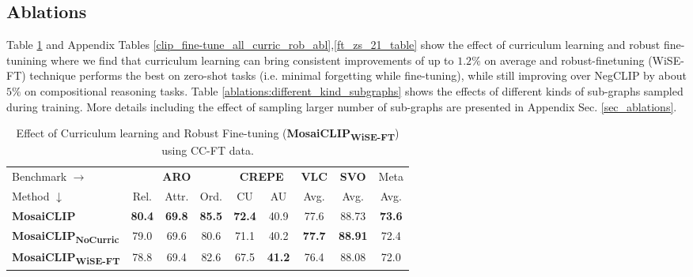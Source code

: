\documentclass[11pt]{article}
\newcommand{\methodcompbold}{\textbf{MosaiCLIP}}
\newcommand{\methodcompNoCurricbold}{\textbf{MosaiCLIP\textsubscript{NoCurric}}}
\newcommand{\methodcompwiseftbold}{\textbf{MosaiCLIP\textsubscript{WiSE-FT}}}
\newcommand{\negclip}{NegCLIP}
\begin{document}
\subsection{Ablations}
\label{abl_main_paper}
Table \ref{ablations_cc_ft} and Appendix Tables \ref{clip_fine-tune_all_curric_rob_abl},\ref{ft_zs_21_table} show the effect of curriculum learning and robust fine-tunining where we find that curriculum learning can bring consistent improvements of up to $1.2\%$ on average and robust-finetuning (WiSE-FT) technique performs the best on zero-shot tasks (i.e. minimal forgetting while fine-tuning), while still improving over \negclip{} by about $5\%$ on compositional reasoning tasks. Table \ref{ablations:different_kind_subgraphs} shows the effects of different kinds of sub-graphs sampled during training. 
More details including the effect of sampling larger number of sub-graphs are presented in Appendix Sec. \ref{sec_ablations}.

\label{main_paper_ablations}
\begin{table}[h!]
\small
  \fontsize{7.5}{10pt}\selectfont
      \centering
      \setlength{\tabcolsep}{2.5pt}
      {
      \begin{tabular}{lccccccc|c}
        \toprule
        \multicolumn{1}{l}{Benchmark $\rightarrow$} & \multicolumn{3}{c}{\textbf{ARO}} & \multicolumn{2}{c}{\textbf{CREPE}} & \multicolumn{1}{c}{\textbf{VLC}} & \multicolumn{1}{c|}{\textbf{SVO}} & Meta \\
        \cmidrule(lr){2-4} \cmidrule(lr){5-6} \cmidrule(lr){7-7} \cmidrule(lr){8-8}
        Method $\downarrow$ & Rel. & Attr. & Ord. & CU & AU & Avg. & Avg. & Avg. \\
        \midrule
          \methodcompbold{}             & \textbf{80.4} & \textbf{69.8} & \textbf{85.5} & \textbf{72.4} & 40.9 & 77.6 & 88.73 & \textbf{73.6}\\[1pt]
          \methodcompNoCurricbold{}     & 79.0 & 69.6 & 80.6 & 71.1 & 40.2 & \textbf{77.7} & \textbf{88.91} & 72.4\\[1pt]
          \methodcompwiseftbold{}       & 78.8 & 69.4 & 82.6 & 67.5 & \textbf{41.2} & 76.4 & 88.08 & 72.0\\[1pt]
        \bottomrule
      \end{tabular}
      }
      
      \caption{Effect of Curriculum learning and Robust Fine-tuning (\methodcompwiseftbold{}) using CC-FT data.}
      \label{ablations_cc_ft}
      \vspace{-1em}
\end{table}
\end{document}
